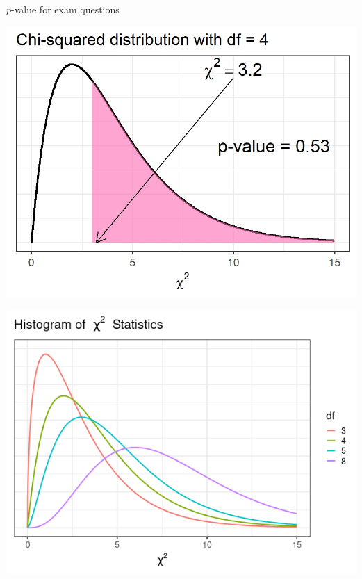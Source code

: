 \documentclass{beamer}
\begin{document}
\begin{frame}{$p$-value for exam questions}
\begin{center}
\includegraphics[scale=0.65]{img/chisq_p.jpeg}
\end{center}
\end{frame}


\begin{frame}
\begin{center}
\includegraphics[scale=0.5]{chisq.png}
\end{center}
\end{frame}
\end{document}
